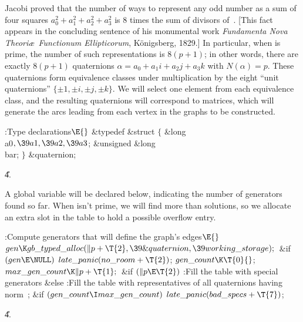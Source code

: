 Jacobi proved that the number of ways to represent
any odd number  as a sum of four squares $a_0^2+a_1^2+a_2^2+a_3^2$
is 8 times the sum of divisors of~. [This fact appears in the
concluding sentence of his monumental work {\sl Fundamenta Nova
Theori\ae\ Functionum Ellipticorum}, K\"onigsberg, 1829.]
In particular, when  is prime,
the number of such representations is $8(p+1)$; in other words, there are
exactly $8(p+1)$ quaternions $\alpha=a_0+a_1i+a_2j+a_3k$ with $N(\alpha)=p$.
These quaternions form  equivalence classes under
multiplication
by the eight ``unit quaternions'' $\{\pm1,\pm i,\pm j,\pm k\}$. We will
select one element from each equivalence class, and the resulting 
quaternions will correspond to  matrices, which will generate
the 
arcs leading from each vertex in the graphs to be constructed.

\Y\B\4:Type declarations\X${}\E{}$\6
\&{typedef} \&{struct} ${}\{{}$\1\6
\&{long} \\{a0}${},\39\\{a1},\39\\{a2},\39\\{a3}{}$;\6
\&{unsigned} \&{long} \\{bar};\2\6
${}\}{}$ \&{quaternion};\par
\U4.\fi

A global variable  will be declared below,
indicating the number of generators found so far. When  isn't prime,
we will find more than  solutions, so we allocate an extra slot
in
the  table to hold a possible overflow entry.

\Y\B\4:Compute  generators that will define the graph's
edges\X${}\E{}$\6
$\\{gen}\K\\{gb\_typed\_alloc}(\|p+\T{2},\39\&{quaternion},\39\\{working%
\_storage});{}$\6
\&{if} ${}(\\{gen}\E\NULL){}$\1\5
${}\\{late\_panic}(\\{no\_room}+\T{2}){}$;\2\6
${}\\{gen\_count}\K\T{0}{}$;\5
${}\\{max\_gen\_count}\K\|p+\T{1};{}$\6
\&{if} ${}(\|p\E\T{2}){}$\1\5
:Fill the  table with special generators\X\2\6
\&{else}\1\5
:Fill the  table with representatives of all quaternions having
norm~\X;\2\6
\&{if} ${}(\\{gen\_count}\I\\{max\_gen\_count}){}$\1\5
${}\\{late\_panic}(\\{bad\_specs}+\T{7}){}$;\2\par
\U4.\fi


